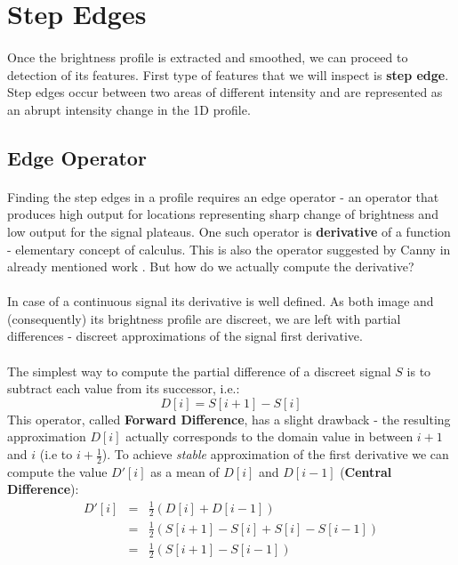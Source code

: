 \section{Step Edges}

\paragraph*{}
Once the brightness profile is extracted and smoothed, we can proceed to detection of its features. First type of features that we will inspect is \textbf{step edge}. Step edges occur between two areas of different intensity and are represented as an abrupt intensity change in the 1D profile.

\subsection{Edge Operator}

\paragraph*{}
Finding the step edges in a profile requires an edge operator - an operator that produces high output for locations representing sharp change of brightness and low output for the signal plateaus. One such operator is \textbf{derivative} of a function - elementary concept of calculus. This is also the operator suggested by Canny in already mentioned work \cite{Canny86}. But how do we actually compute the derivative? 

\paragraph*{}
In case of a continuous signal its derivative is well defined. As both image and (consequently) its brightness profile are discreet, we are left with partial differences - discreet approximations of the signal first derivative.

\paragraph*{}
The simplest way to compute the partial difference of a discreet signal $S$ is to subtract each value from its successor, i.e.:
\[
	D[i] = S[i+1]-S[i]
\]  
This operator, called \textbf{Forward Difference}, has a slight drawback - the resulting approximation $D[i]$ actually corresponds to the domain value in between $i+1$ and $i$ (i.e to $i+\frac{1}{2}$). To achieve \textit{stable} approximation of the first derivative we can compute the value $D'[i]$ as a mean of $D[i]$ and $D[i-1]$ (\textbf{Central Difference}):
\begin{eqnarray*}
D'[i] & = & \frac{1}{2}(D[i]+D[i-1]) \\
	& = & \frac{1}{2}(S[i+1]-S[i]+S[i]-S[i-1]) \\
	& = & \frac{1}{2}(S[i+1]-S[i-1])
\end{eqnarray*}


